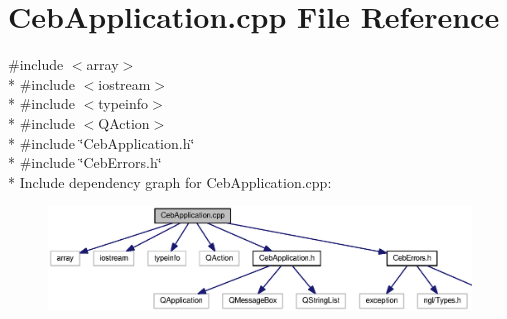 \section{Ceb\-Application.\-cpp File Reference}
\label{_ceb_application_8cpp}
{\ttfamily \#include $<$array$>$}\\*
{\ttfamily \#include $<$iostream$>$}\\*
{\ttfamily \#include $<$typeinfo$>$}\\*
{\ttfamily \#include $<$Q\-Action$>$}\\*
{\ttfamily \#include \char`\"{}Ceb\-Application.\-h\char`\"{}}\\*
{\ttfamily \#include \char`\"{}Ceb\-Errors.\-h\char`\"{}}\\*
Include dependency graph for Ceb\-Application.\-cpp\-:\nopagebreak
\begin{figure}[H]
\begin{center}
\leavevmode
\includegraphics[width=350pt]{_ceb_application_8cpp__incl}
\end{center}
\end{figure}
